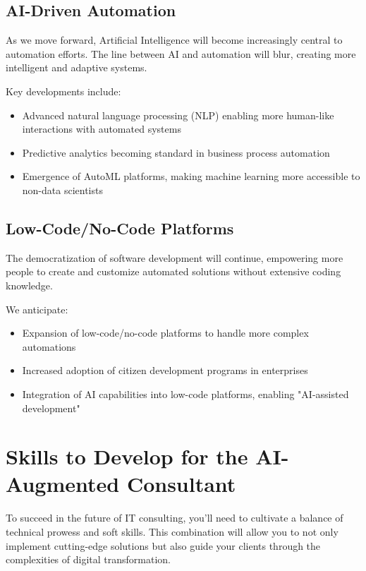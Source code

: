 \subsection{AI-Driven Automation}

As we move forward, Artificial Intelligence will become increasingly central to automation efforts. The line between AI and automation will blur, creating more intelligent and adaptive systems.

Key developments include:

\begin{itemize}
    \item Advanced natural language processing (NLP) enabling more human-like interactions with automated systems
    \item Predictive analytics becoming standard in business process automation
    \item Emergence of AutoML platforms, making machine learning more accessible to non-data scientists
\end{itemize}

\subsection{Low-Code/No-Code Platforms}

The democratization of software development will continue, empowering more people to create and customize automated solutions without extensive coding knowledge.

We anticipate:

\begin{itemize}
    \item Expansion of low-code/no-code platforms to handle more complex automations
    \item Increased adoption of citizen development programs in enterprises
    \item Integration of AI capabilities into low-code platforms, enabling "AI-assisted development"
\end{itemize}


\section{Skills to Develop for the AI-Augmented Consultant}

To succeed in the future of IT consulting, you'll need to cultivate a balance of technical prowess and soft skills. This combination will allow you to not only implement cutting-edge solutions but also guide your clients through the complexities of digital transformation.

